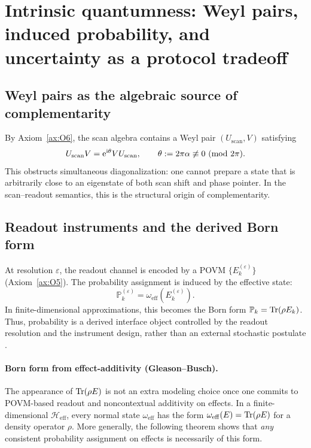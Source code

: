
\section{Intrinsic quantumness: Weyl pairs, induced probability, and uncertainty as a protocol tradeoff}
\label{sec:weyl_readout}

\subsection{Weyl pairs as the algebraic source of complementarity}
\label{sec:weyl_pair}

By Axiom~\ref{ax:O6}, the scan algebra contains a Weyl pair $(U_{\mathrm{scan}},V)$ satisfying
\[
U_{\mathrm{scan}}V=\mathrm{e}^{\mathrm{i}\theta}VU_{\mathrm{scan}},
\qquad \theta:=2\pi\alpha\not\equiv 0 \ (\mathrm{mod}\ 2\pi).
\]
This obstructs simultaneous diagonalization: one cannot prepare a state that is arbitrarily close to an eigenstate of both scan shift and phase pointer.
In the scan--readout semantics, this is the structural origin of complementarity.

\subsection{Readout instruments and the derived Born form}
\label{sec:povm_semantics}

At resolution $\varepsilon$, the readout channel is encoded by a POVM $\{E_k^{(\varepsilon)}\}$ (Axiom~\ref{ax:O5}).
The probability assignment is induced by the effective state:
\[
\mathbb{P}_k^{(\varepsilon)}=\omega_{\mathrm{eff}}\!\left(E_k^{(\varepsilon)}\right).
\]
In finite-dimensional approximations, this becomes the Born form $\mathbb{P}_k=\mathrm{Tr}(\rho E_k)$.
Thus, probability is a derived interface object controlled by the readout resolution and the instrument design, rather than an external stochastic postulate \cite{Kraus1983,NielsenChuang2000,Busch2003}.

\paragraph{Born form from effect-additivity (Gleason--Busch).}
The appearance of $\mathrm{Tr}(\rho E)$ is not an extra modeling choice once one commits to POVM-based readout and noncontextual additivity on effects.
In a finite-dimensional $\mathcal{H}_{\mathrm{eff}}$, every normal state $\omega_{\mathrm{eff}}$ has the form $\omega_{\mathrm{eff}}(E)=\mathrm{Tr}(\rho E)$ for a density operator $\rho$.
More generally, the following theorem shows that \emph{any} consistent probability assignment on effects is necessarily of this form.

